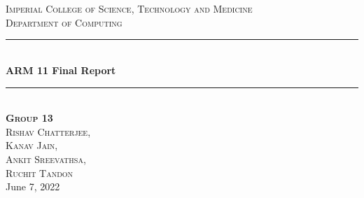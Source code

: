 \documentclass[a4paper]{article}
\begin{document}
\begin{titlepage}
\newcommand{\HRule}{\rule{\linewidth}{0.5mm}} %
\setlength{\topmargin}{0in}
\center %
 \begin{minipage}{0.4\textwidth}
\begin{flushleft} \large
\hspace*{-0.5cm}
\end{flushleft}
\end{minipage}
~
\begin{minipage}{0.5\textwidth}
\begin{flushright} \large
\hspace*{2cm}
\end{flushright}
\end{minipage}\\[1cm]
\textsc{\LARGE Imperial College of Science, Technology and Medicine}\\[1.5cm] 
\textsc{\Large Department of Computing}\\[0.5cm] 
\HRule \\[0.4cm]
{ \huge \bfseries ARM 11 Final Report}\\[0.4cm]
\HRule \\[1cm]
\textsc{{\large
\textbf{Group 13} \\
Rishav \textsc{Chatterjee}, \\
Kanav \textsc{Jain}, \\ 
Ankit \textsc{Sreevathsa}, \\
Ruchit \textsc{Tandon} }}\\[0.5cm]
{\large June 7, 2022}\\[0.5cm] 
\vfill 
\end{titlepage}
\newpage
\end{document}

